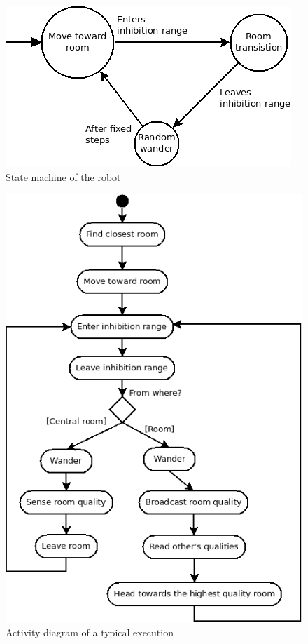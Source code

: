 \documentclass[11pt, a4paper]{article}
\begin{document}
\begin{figure}[H]
\includegraphics[width=.95\textwidth]{state-machine}
\caption{State machine of the robot}
\label{fig:state-machine}
\end{figure}

\begin{figure}[H]
\includegraphics[width=.95\textwidth]{activity}
\caption{Activity diagram of a typical execution}
\label{fig:activity}
\end{figure}
\end{document}
